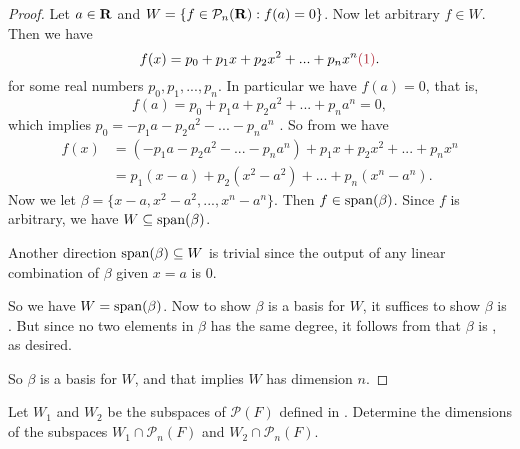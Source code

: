 \begin{proof}
Let \(a \in \mathbf{R}\) and \(W = \{ f \in \mathcal{P}_n(\mathbf{R}) : f(a) = 0 \}\).
Now let arbitrary \(f \in W\).
Then we have
\[
    f(x) = p_0 + p_1 x + p_2 x^2 + ... + p_n x^n \MAROON{(1)}.
\]
for some real numbers \(p_0, p_1, ..., p_n\).
In particular we have \(f(a) = 0\), that is,
\[
    f(a) = p_0 + p_1 a + p_2 a^2 + ... + p_n a^n = 0,
\]
which implies \(p_0 = -p_1 a - p_2 a^2 - ... - p_n a^n\) .
So from  we have
\begin{align*}
    f(x) & = (-p_1 a - p_2 a^2 - ... - p_n a^n) + p_1 x + p_2 x^2 + ... + p_n x^n \\
         & = p_1(x - a) + p_2(x^2 - a^2) + ... + p_n (x^n - a^n).
\end{align*}
Now we let \(\beta = \{ x - a, x^2 - a^2, ..., x^n - a^n \}\).
Then \(f \in \operatorname{span}(\beta)\).
Since \(f\) is arbitrary, we have \(W \subseteq \operatorname{span}(\beta)\).

Another direction \(\operatorname{span}(\beta) \subseteq W\) is trivial since the output of any linear combination of \(\beta\) given \(x = a\) is \(0\).

So we have \(W = \operatorname{span}(\beta)\).
Now to show \(\beta\) is a basis for \(W\), it suffices to show \(\beta\) is \LID{}.
But since no two elements in \(\beta\) has the same degree, it follows from  that \(\beta\) is \LID{}, as desired.

So \(\beta\) is a basis for \(W\), and that implies \(W\) has dimension \(n\).
\end{proof}

\begin{exercise} \label{exercise 1.6.27}
Let \(W_1\) and \(W_2\) be the subspaces of \(\mathcal{P}(F)\) defined in .
Determine the dimensions of the subspaces \(W_1 \cap \mathcal{P}_n(F)\) and \(W_2 \cap \mathcal{P}_n(F)\).
\end{exercise}

